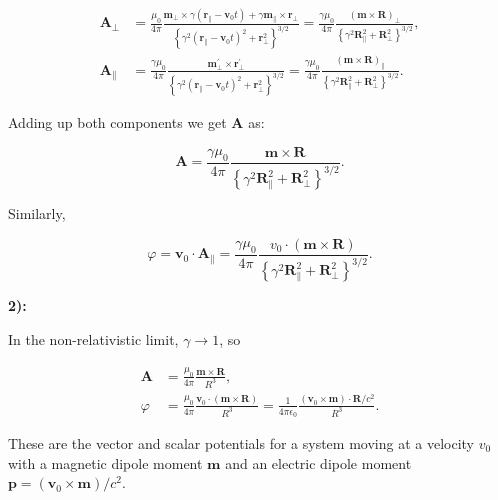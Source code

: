 \begin{equation}
	\begin{split}
		\mathbf{A}_{\perp}&=\frac{\mu_{0}}{4 \pi} \frac{\mathbf{m}_{\perp} \times \gamma\left(\mathbf{r}_{\|}-\mathbf{v}_{0} t\right)+\gamma \mathbf{m}_{\|} \times \mathbf{r}_{\perp}}{\left\{\gamma^{2}\left(\mathbf{r}_{\|}-\mathbf{v}_{0} t\right)^{2}+\mathbf{r}_{\perp}^{2}\right\}^{3 / 2}}=\frac{\gamma \mu_{0}}{4 \pi} \frac{(\mathbf{m} \times \mathbf{R})_{\perp}}{\left\{\gamma^{2} \mathbf{R}_{\|}^{2}+\mathbf{R}_{\perp}^{2}\right\}^{3 / 2}},\\
		\mathbf{A}_{\|}&=\frac{\gamma \mu_{0}}{4 \pi} \frac{\mathbf{m}_{\perp}^{\prime} \times \mathbf{r}_{\perp}^{\prime}}{\left\{\gamma^{2}\left(\mathbf{r}_{\|}-\mathbf{v}_{0} t\right)^{2}+\mathbf{r}_{\perp}^{2}\right\}^{3 / 2}}=\frac{\gamma \mu_{0}}{4 \pi} \frac{(\mathbf{m} \times \mathbf{R})_{\|}}{\left\{\gamma^{2} \mathbf{R}_{\|}^{2}+\mathbf{R}_{\perp}^{2}\right\}^{3 / 2}}.
	\end{split}
\end{equation}

Adding up both components we get $\mathbf{A}$ as:

\begin{equation}
	\mathbf{A}=\frac{\gamma \mu_{0}}{4 \pi} \frac{\mathbf{m} \times \mathbf{R}}{\left\{\gamma^{2} \mathbf{R}_{\|}^{2}+\mathbf{R}_{\perp}^{2}\right\}^{3 / 2}}.
\end{equation}

Similarly,

\begin{equation}
	\varphi=\mathbf{v}_{0} \cdot \mathbf{A}_{\|}=\frac{\gamma \mu_{0}}{4 \pi} \frac{v_{0} \cdot(\mathbf{m} \times \mathbf{R})}{\left\{\gamma^{2} \mathbf{R}_{\|}^{2}+\mathbf{R}_{\perp}^{2}\right\}^{3 / 2}}.
\end{equation}

\textbf{2):}

In the non-relativistic limit, $\gamma \rightarrow 1$, so

\begin{equation}
	\begin{split}
		\mathbf{A} &=\frac{\mu_{0}}{4 \pi} \frac{\mathbf{m} \times \mathbf{R}}{R^{3}}, \\
		\varphi &=\frac{\mu_{0}}{4 \pi} \frac{\mathbf{v}_{0} \cdot(\mathbf{m} \times \mathbf{R})}{R^{3}}=\frac{1}{4 \pi \epsilon_{0}} \frac{\left(\mathbf{v}_{0} \times \mathbf{m}\right) \cdot \mathbf{R} / c^{2}}{R^{3}} .
	\end{split}
\end{equation}

These are the vector and scalar potentials for a system moving at a velocity $v_{0}$ with a magnetic dipole moment $\mathbf{m}$ and an electric dipole moment $\mathbf{p}=\left(\mathbf{v}_{0} \times \mathbf{m}\right) / c^{2}$.
















